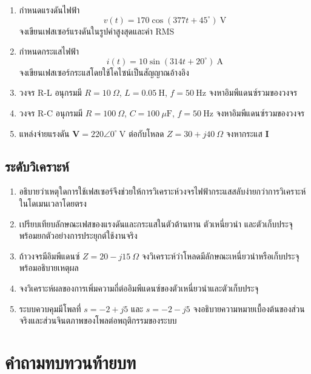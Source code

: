 \begin{enumerate}[resume]
\item กำหนดแรงดันไฟฟ้า
\[
v(t)=170\cos(377t+45^\circ)\ \text{V}
\]
จงเขียนเฟสเซอร์แรงดันในรูปค่าสูงสุดและค่า RMS
\item กำหนดกระแสไฟฟ้า
\[
i(t)=10\sin(314t+20^\circ)\ \text{A}
\]
จงเขียนเฟสเซอร์กระแสโดยใช้โคไซน์เป็นสัญญาณอ้างอิง
\item วงจร R-L อนุกรมมี $R=10\ \Omega$, $L=0.05\ \text{H}$, $f=50\ \text{Hz}$ จงหาอิมพีแดนซ์รวมของวงจร
\item วงจร R-C อนุกรมมี $R=100\ \Omega$, $C=100\ \mu\text{F}$, $f=50\ \text{Hz}$ จงหาอิมพีแดนซ์รวมของวงจร
\item แหล่งจ่ายแรงดัน $\mathbf{V}=220\angle0^\circ\ \text{V}$ ต่อกับโหลด $Z=30+j40\ \Omega$ จงหากระแส $\mathbf{I}$
\end{enumerate}

\subsection{ระดับวิเคราะห์}

\begin{enumerate}[resume]
\item อธิบายว่าเหตุใดการใช้เฟสเซอร์จึงช่วยให้การวิเคราะห์วงจรไฟฟ้ากระแสสลับง่ายกว่าการวิเคราะห์ในโดเมนเวลาโดยตรง
\item เปรียบเทียบลักษณะเฟสของแรงดันและกระแสในตัวต้านทาน ตัวเหนี่ยวนำ และตัวเก็บประจุ พร้อมยกตัวอย่างการประยุกต์ใช้งานจริง
\item ถ้าวงจรมีอิมพีแดนซ์ $Z=20-j15\ \Omega$ จงวิเคราะห์ว่าโหลดมีลักษณะเหนี่ยวนำหรือเก็บประจุ พร้อมอธิบายเหตุผล
\item จงวิเคราะห์ผลของการเพิ่มความถี่ต่ออิมพีแดนซ์ของตัวเหนี่ยวนำและตัวเก็บประจุ
\item ระบบควบคุมมีโพลที่ $s=-2+j5$ และ $s=-2-j5$ จงอธิบายความหมายเบื้องต้นของส่วนจริงและส่วนจินตภาพของโพลต่อพฤติกรรมของระบบ
\end{enumerate}

\section{คำถามทบทวนท้ายบท}

